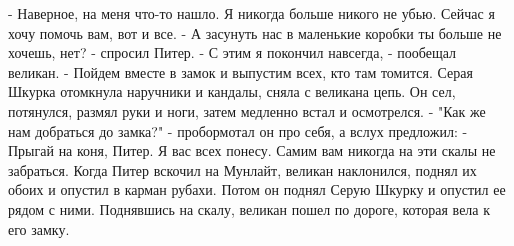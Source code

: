     - Наверное, на меня что-то нашло. Я никогда больше никого не убью. 
Сейчас я хочу помочь вам, вот и все.
    - А засунуть нас в маленькие коробки ты больше не хочешь, нет? - 
спросил Питер.
    - С этим я покончил навсегда, - пообещал великан. - Пойдем вместе 
в замок и выпустим всех, кто там томится.
    Серая Шкурка отомкнула наручники и кандалы, сняла с великана цепь. 
Он сел, потянулся, размял руки и ноги, затем медленно встал и 
осмотрелся.
    - "Как же нам добраться до замка?" - пробормотал он про себя, а 
вслух предложил: - Прыгай на коня, Питер. Я вас всех понесу. Самим вам 
никогда на эти скалы не забраться.
    Когда Питер вскочил на Мунлайт, великан наклонился, поднял их 
обоих и опустил в карман рубахи. Потом он поднял Серую Шкурку и 
опустил ее рядом с ними. Поднявшись на скалу, великан пошел по дороге, 
которая вела к его замку.
